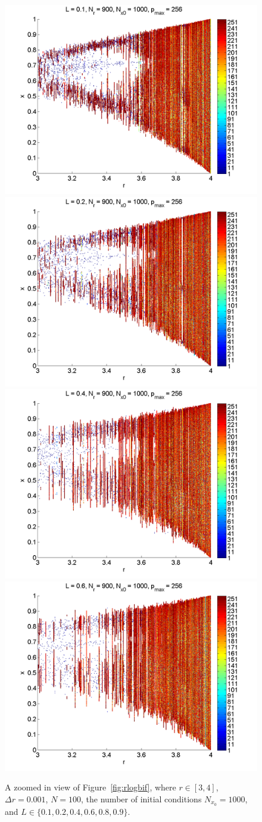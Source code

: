 \begin{figure}[H]\linespread{1}
\caption[Bifurcation diagram of the random logistic map, zoomed
in]{A zoomed in view of Figure~\ref{fig:rlogbif}, where $r \in
  [3,4]$, $\Delta r = 0.001$, $N=100$, the number of initial
  conditions $N_{x_0}=1000$, and $L\in \{0.1,0.2,0.4,0.6,0.8,0.9\}$.}
	\begin{center}
		\includegraphics[width=.5\textwidth]{figs/rlog_bif_zoom_L_01.png}\hfill
		\includegraphics[width=.5\textwidth]{figs/rlog_bif_zoom_L_02.png}\\
		\includegraphics[width=.5\textwidth]{figs/rlog_bif_zoom_L_04.png}\hfill
		\includegraphics[width=.5\textwidth]{figs/rlog_bif_zoom_L_06.png}\\

\end{center}
\end{figure}
